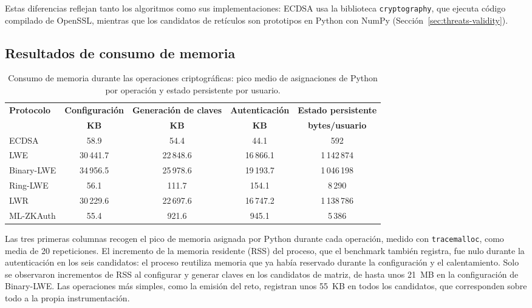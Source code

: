 Estas diferencias reflejan tanto los algoritmos como sus implementaciones: ECDSA usa la biblioteca \texttt{cryptography}, que ejecuta código compilado de OpenSSL, mientras que los candidatos de retículos son prototipos en Python con NumPy (Sección~\ref{sec:threats-validity}).


\subsection{Resultados de consumo de memoria}
\label{sec:memory-results}

\begin{table}[H]
\centering
\caption{Consumo de memoria durante las operaciones criptográficas: pico medio de asignaciones de Python por operación y estado persistente por usuario.}
\label{tab:memory-results}
\small
\begin{tabularx}{\textwidth}{lCCCC}
\toprule
\textbf{Protocolo} &
\textbf{Configuración} &
\textbf{Generación de claves} &
\textbf{Autenticación} &
\textbf{Estado persistente} \\
&
\textbf{KB} &
\textbf{KB} &
\textbf{KB} &
\textbf{bytes/usuario} \\
\midrule

ECDSA      & 58.9 & 54.4 & 44.1 & 592 \\
LWE        & 30\,441.7 & 22\,848.6 & 16\,866.1 & 1\,142\,874 \\
Binary-LWE & 34\,956.5 & 25\,978.6 & 19\,193.7 & 1\,046\,198 \\
Ring-LWE   & 56.1 & 111.7 & 154.1 & 8\,290 \\
LWR        & 30\,229.6 & 22\,697.6 & 16\,747.2 & 1\,138\,786 \\
ML-ZKAuth  & 55.4 & 921.6 & 945.1 & 5\,386 \\

\bottomrule
\end{tabularx}
\end{table}

Las tres primeras columnas recogen el pico de memoria asignada por Python durante cada operación, medido con \texttt{tracemalloc}, como media de 20 repeticiones. El incremento de la memoria residente (RSS) del proceso, que el benchmark también registra, fue nulo durante la autenticación en los seis candidatos: el proceso reutiliza memoria que ya había reservado durante la configuración y el calentamiento. Solo se observaron incrementos de RSS al configurar y generar claves en los candidatos de matriz, de hasta unos 21~MB en la configuración de Binary-LWE. Las operaciones más simples, como la emisión del reto, registran unos 55~KB en todos los candidatos, que corresponden sobre todo a la propia instrumentación.

